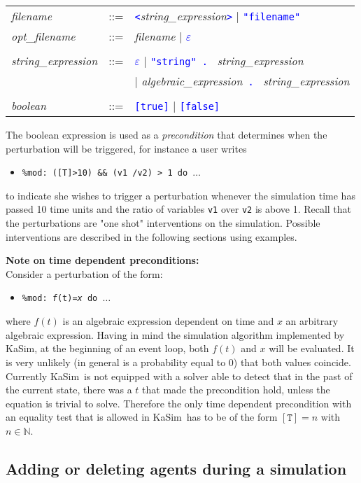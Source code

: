 \documentclass[11pt]{book}
\def\KaSim{\textsf{KaSim}}
\def\tcb#1{\textcolor{blue}{\ttt{#1}}}
\def\ttt#1{\texttt{#1}}
\def\var#1{\textquotesingle #1\textquotesingle}
\def\ITE#1{\begin{itemize}#1\end{itemize}}
\def\Nat{\mathbb N}
\begin{document}
\begin{table}[htbp]
\begin{tabular}{@{} lcl @{}}
    \\
    \textit{filename} &::=& \tcb{<}\textit{string\_expression}\tcb{>} | \tcb{"filename"} \\
    \textit{opt\_filename} &::=& \textit{filename} | \tcb{$\varepsilon$} \\\\
	\textit{string\_expression} &::=& \tcb{$\varepsilon$} | \tcb{"string" . } \textit{string\_expression} \\
    && | \textit{algebraic\_expression}\tcb{ . } \textit{string\_expression} \\\\
	\textit{boolean} &::=& \tcb{[true]} | \tcb{[false]}
  \end{tabular}
  \label{tab:pert}
\end{table}

The boolean expression is used as a \textit{precondition} that determines when the perturbation will be triggered, for instance a user writes
\ITE{
\item[] \ttt{\%mod: ([T]>10) \&\& (\var{v1} /\var{v2}) > 1 do $\dots$}
}
to indicate she wishes to trigger a perturbation whenever the simulation time has passed 10 time units and the ratio of variables \ttt{v1} over \ttt{v2} is above 1. Recall that the perturbations are "one shot" interventions on the simulation. Possible interventions are described in the following sections using examples.

\textbf{Note on time dependent preconditions:}
\\Consider a perturbation of the form:
\ITE{
\item[] \ttt{\%mod: {\it f}(t)={\it x} do $\dots$}
}
where $f(t)$ is an algebraic expression dependent on time and $x$ an arbitrary algebraic expression. Having in mind the simulation algorithm implemented by \KaSim, at the beginning of an event loop, both $f(t)$ and $x$ will be evaluated. It is very unlikely (in general is a probability equal to 0) that both values coincide. Currently \KaSim~is not equipped with a solver able to detect that in the past of the current state, there was a $t$ that made the precondition hold, unless the equation is trivial to solve. Therefore the only time dependent precondition with an equality test that is allowed in \KaSim~has to be of the form $\mathtt{[T]=}n$ with $n\in\Nat$.
 
\subsection{Adding or deleting agents during a simulation}
\end{document}
